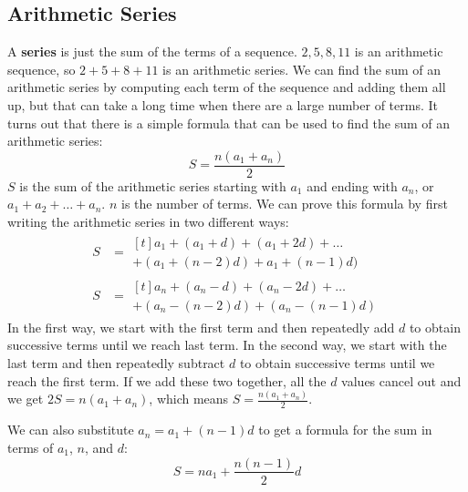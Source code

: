 \documentclass{article}
\begin{document}
\begin{multicols}{2}
        \subsection*{Arithmetic Series}
        A \textbf{series} is just the sum of the terms of a sequence. $2, 5, 8,
        11$ is an arithmetic sequence, so $2 + 5 + 8 + 11$ is an arithmetic
        series. We can find the sum of an arithmetic series by computing each
        term of the sequence and adding them all up, but that can take a long
        time when there are a large number of terms. It turns out that there is
        a simple formula that can be used to find the sum of an arithmetic
        series:
        \[S = \frac{n(a_1 + a_n)}{2}\] $S$ is the sum of the arithmetic series
        starting with $a_1$ and ending with $a_n$, or $a_1 + a_2 + \dots + a_n$.
        $n$ is the number of terms. We can prove this formula by first writing
        the arithmetic series in two different ways:
        \begin{align*}
            S &= \begin{multlined}[t]
                a_1 + (a_1 + d) + (a_1 + 2d) + \dots \\
                + (a_1 + (n - 2)d) + a_1 + (n - 1)d)
            \end{multlined} \\
            S &= \begin{multlined}[t]
                a_n + (a_n - d) + (a_n - 2d) + \dots \\
                + (a_n - (n - 2)d) + (a_n - (n - 1)d)
            \end{multlined}
        \end{align*}
        In the first way, we start with the first term and then repeatedly add
        $d$ to obtain successive terms until we reach last term. In the second
        way, we start with the last term and then repeatedly subtract $d$ to
        obtain successive terms until we reach the first term. If we add these
        two together, all the $d$ values cancel out and we get $2S = n(a_1 +
        a_n)$, which means $S = \frac{n(a_1 + a_n)}{2}$.

        We can also substitute $a_n = a_1 + (n - 1)d$ to get a formula for the
        sum in terms of $a_1$, $n$, and $d$:
        \[S = na_1 + \frac{n(n - 1)}{2}d\]


\end{multicols}
\end{document}
